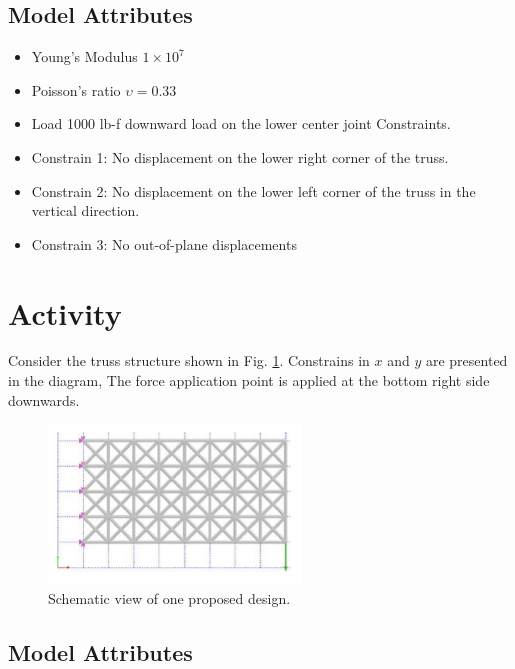 \documentclass[letterpaper,pdftex]{article}
\begin{document}
\subsection{Model Attributes}

\begin{itemize}
\item Young's Modulus $1 \times 10^7$ 
\item Poisson's ratio $\upsilon = 0.33$
\item Load 1000 lb-f downward load on the lower center joint Constraints.
\item Constrain 1: No displacement on the lower right corner of the truss.
\item Constrain 2: No displacement on the lower left corner of the truss in the vertical direction.
\item Constrain 3: No out-of-plane displacements
\end{itemize}

\section{Activity}

Consider the truss structure shown in Fig. \ref{fig:trussex}. Constrains in $x$ and $y$ are presented in the diagram, The force application point is applied at the bottom right side downwards. 

\begin{figure}[h]
   \centering
   \includegraphics[width=0.6\textwidth]{Structure}
   \caption{Schematic view of one proposed design.}
   \label{fig:trussex}
\end{figure}

\subsection{Model Attributes}
\end{document}
